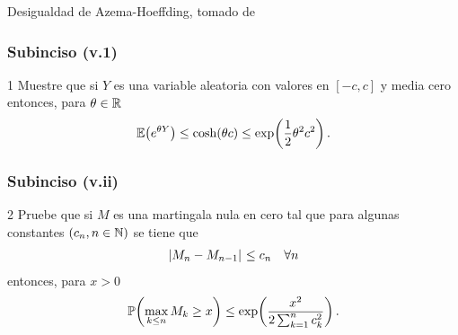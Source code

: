 Desigualdad de Azema-Hoeffding, tomado de \cite[E14.2, p.237]{MR1155402}
\subsubsection{Subinciso (v.1)}
	 1 Muestre que si $Y$ es una variable aleatoria con valores en $[-c,c]$ y media cero entonces, para $\theta\in\mathbb{R}$
	\begin{align}
		\mathbb{E}\! \left( e^{\theta Y} \right)\leq\cosh\!\left( \theta c\right) \leq \exp\!\left( \frac{1}{2}\theta^2c^2\right) . 
	\end{align}
	\newpage

\subsubsection{Subinciso (v.ii)} 
	2 Pruebe que si $M$ es una martingala nula en cero tal que para algunas constantes $\left( c_n,n\in\mathbb{N}\right) $ se tiene que
	\begin{align}
		\hspace{.25mm}\left|M_n-M_{n-1}\right|\hspace{.25mm}\leq c_n\quad\forall n
	\end{align}
	entonces, para $x>0$
	\begin{align}
		\mathbb{P}\! \left( \max_{k\leq n} M_k\geq x \right)\leq \exp\!\left( \frac{x^2}{2\sum_{k=1}^n c_k^2}\right) .
	\end{align}
